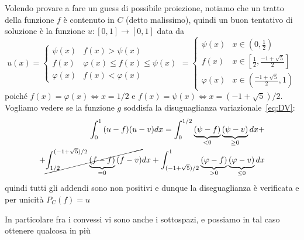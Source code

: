 \begin{eser}
\begin{enumerate}[label = \alph*.]
    Volendo provare a fare un guess di possibile proiezione, notiamo che un
    tratto della funzione \(f\) è contenuto in \(C\) (detto malissimo), quindi
    un buon tentativo di soluzione è la funzione \(u : [0,1] \to [0,1]\) data da
    \[
      u{(x)} = \begin{cases}
          \psi {(x)} & f{(x)} > \psi {(x)} \\
          f{(x)} & \varphi {(x)} \le f{(x)} \le \psi {(x)} \\
          \varphi {(x)} & f{(x)} < \varphi  {(x)}
      \end{cases} = 
      \begin{cases}
          \psi {(x)} & x \in (0, \frac{1}{2}) \\
          f{(x)} & x \in [\frac{1}{2}, \frac{-1 + \sqrt{5}}{2}] \\
          \varphi {(x)} & x \in (\frac{-1 + \sqrt{5}}{2}, 1)
      \end{cases}
    \]
    poiché \(f{(x)} = \varphi {(x)} \iff x = 1 / 2\) e \(f{(x)} = \psi {(x)}
    \iff x = (-1 + \sqrt{5}) / 2\). Vogliamo vedere se la funzione \(g\)
    soddisfa la disuguaglianza variazionale~\eqref{eq:DV}:
    \begin{align*}
        \int_{0}^{1}{(u - f)}{(u - v)}dx = \int_0^{1 /2} \underbrace{(\psi -
        f)}_{< 0} \underbrace{(\psi - v)}_{\ge 0} dx  + \\ + \cancel{\int_{1
        /2}^{(-1 + \sqrt{5}) / 2} \underbrace{(f - f)}_{=0} {(f - v)}}dx +
        \int_{(-1 + \sqrt{5}) / 2}^{1} \underbrace{(\varphi - f)}_{> 0}
        \underbrace{(\varphi - v)}_{\le 0} dx
    \end{align*}
    quindi tutti gli addendi sono non positivi e dunque la diseguaglianza è
    verificata e per unicità \(P_C{(f)} = u\) 
\end{enumerate}
\end{eser}

In particolare fra i convessi vi sono anche i sottospazi, e possiamo in tal caso
ottenere qualcosa in più


